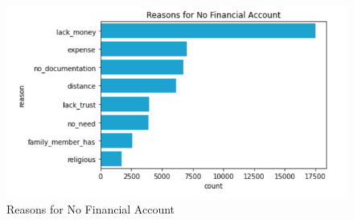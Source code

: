 \documentclass[water,article,submit,moreauthors,pdftex]{mdpi}
\begin{document}
\begin{figure}
\centering
\includegraphics[width=\textwidth,height=0.5\textheight]{images/reasons_no_fin_acc.png}
\caption{Reasons for No Financial Account}
\end{figure}

%

\vspace{6pt}








\end{document}
